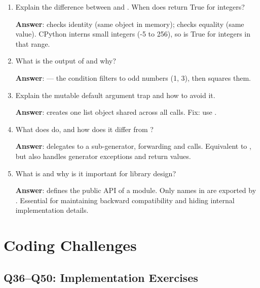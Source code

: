 \begin{enumerate}[leftmargin=*]
    \item[Q31.] Explain the difference between  and \code{==}. When does  return True for integers?
    
    \textbf{Answer}:  checks identity (same object in memory); \code{==} checks equality (same value). CPython interns small integers (-5 to 256), so  is True for integers in that range.
    
    \item[Q32.] What is the output of  and why?
    
    \textbf{Answer}: \code{[1, 9]} --- the condition filters to odd numbers (1, 3), then squares them.
    
    \item[Q33.] Explain the mutable default argument trap and how to avoid it.
    
    \textbf{Answer}:  creates one list object shared across all calls. Fix: use .
    
    \item[Q34.] What does  do, and how does it differ from ?
    
    \textbf{Answer}:  delegates to a sub-generator, forwarding  and  calls. Equivalent to , but also handles generator exceptions and return values.
    
    \item[Q35.] What is  and why is it important for library design?
    
    \textbf{Answer}:  defines the public API of a module. Only names in  are exported by . Essential for maintaining backward compatibility and hiding internal implementation details.
\end{enumerate}


\section{Coding Challenges}

\subsection{Q36--Q50: Implementation Exercises}

